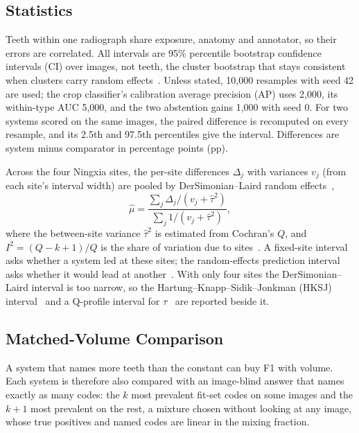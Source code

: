 \subsection{Statistics}

Teeth within one radiograph share exposure, anatomy and annotator, so their errors are correlated. All
intervals are 95\% percentile bootstrap confidence intervals (CI) over images, not teeth, the cluster bootstrap that stays
consistent when clusters carry random effects~\cite{field2007bootstrapping}. Unless stated, 10,000
resamples with seed 42 are used; the crop classifier's calibration average precision (AP) uses 2,000, its within-type AUC
5,000, and the two abstention gains 1,000 with seed 0. For two systems scored on the same images, the
paired difference is recomputed on every resample, and its 2.5th and 97.5th percentiles give the
interval. Differences are system minus comparator in percentage points (pp). %

Across the four Ningxia sites, the per-site differences $\Delta_j$ with variances $v_j$ (from each
site's interval width) are pooled by DerSimonian--Laird random effects~\cite{dersimonian1986meta},
\begin{equation}
\hat\mu = \frac{\sum_j \Delta_j / (v_j + \hat\tau^2)}{\sum_j 1 / (v_j + \hat\tau^2)},
\label{eq:dl}
\end{equation}
where the between-site variance $\hat\tau^2$ is estimated from Cochran's $Q$, and
$I^2 = (Q - k + 1)/Q$ is the share of variation due to sites~\cite{higgins2002quantifying}. A fixed-site
interval asks whether a system led at these sites; the random-effects prediction interval asks whether
it would lead at another~\cite{riley2011interpretation}. With only four sites the DerSimonian--Laird
interval is too narrow, so the Hartung--Knapp--Sidik--Jonkman (HKSJ) interval~\cite{inthout2014hartung}
and a Q-profile interval for $\tau$~\cite{viechtbauer2007confidence} are reported beside it.

\subsection{Matched-Volume Comparison}

A system that names more teeth than the constant can buy F1 with volume. Each system is therefore also
compared with an image-blind answer that names exactly as many codes: the $k$ most prevalent fit-set
codes on some images and the $k+1$ most prevalent on the rest, a mixture chosen without looking at any
image, whose true positives and named codes are linear in the mixing fraction.

